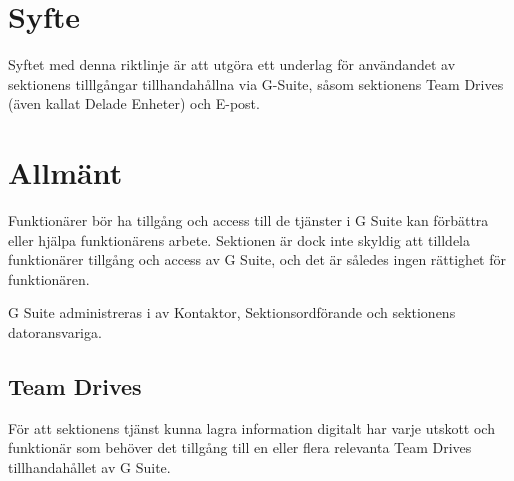 \documentclass[10pt]{article}
\begin{document}
    \section*{\doctitle}
    \section{Syfte}
    
    Syftet med denna riktlinje är att utgöra ett underlag för användandet av sektionens tilllgångar tillhandahållna via G-Suite, såsom sektionens Team Drives (även kallat Delade Enheter) och E-post. 
    
    \section{Allmänt}
    Funktionärer bör ha tillgång och access till de tjänster i G Suite kan förbättra eller hjälpa funktionärens arbete. 
    Sektionen är dock inte skyldig att tilldela funktionärer tillgång och access av G Suite, och det är således ingen rättighet för funktionären. 
 
    G Suite administreras i av Kontaktor, Sektionsordförande och sektionens datoransvariga. 

    \subsection{Team Drives}
    För att sektionens tjänst kunna lagra information digitalt har varje utskott och funktionär som behöver det tillgång till en eller flera relevanta Team Drives tillhandahållet av G Suite. 
\end{document}
